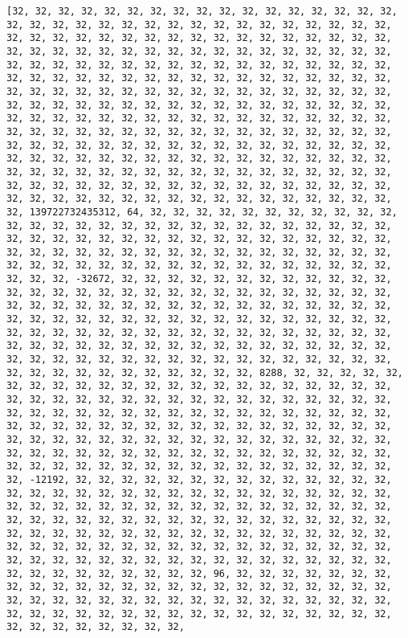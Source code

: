 \documentclass[11pt]{article}
\begin{document}
    \begin{Verbatim}[commandchars=\\\{\}]
[32, 32, 32, 32, 32, 32, 32, 32, 32, 32, 32, 32, 32, 32, 32, 32, 32, 32, 32, 32, 32, 32, 32, 32, 32, 32, 32, 32, 32, 32, 32, 32, 32, 32, 32, 32, 32, 32, 32, 32, 32, 32, 32, 32, 32, 32, 32, 32, 32, 32, 32, 32, 32, 32, 32, 32, 32, 32, 32, 32, 32, 32, 32, 32, 32, 32, 32, 32, 32, 32, 32, 32, 32, 32, 32, 32, 32, 32, 32, 32, 32, 32, 32, 32, 32, 32, 32, 32, 32, 32, 32, 32, 32, 32, 32, 32, 32, 32, 32, 32, 32, 32, 32, 32, 32, 32, 32, 32, 32, 32, 32, 32, 32, 32, 32, 32, 32, 32, 32, 32, 32, 32, 32, 32, 32, 32, 32, 32, 32, 32, 32, 32, 32, 32, 32, 32, 32, 32, 32, 32, 32, 32, 32, 32, 32, 32, 32, 32, 32, 32, 32, 32, 32, 32, 32, 32, 32, 32, 32, 32, 32, 32, 32, 32, 32, 32, 32, 32, 32, 32, 32, 32, 32, 32, 32, 32, 32, 32, 32, 32, 32, 32, 32, 32, 32, 32, 32, 32, 32, 32, 32, 32, 32, 32, 32, 32, 32, 32, 32, 32, 32, 32, 32, 32, 32, 32, 32, 32, 32, 32, 32, 32, 32, 32, 32, 32, 32, 32, 32, 32, 32, 32, 32, 32, 32, 32, 32, 32, 32, 32, 32, 32, 32, 32, 32, 32, 32, 32, 32, 32, 32, 32, 32, 32, 32, 32, 32, 32, 32, 32, 32, 32, 32, 32, 32, 32, 139722732435312, 64, 32, 32, 32, 32, 32, 32, 32, 32, 32, 32, 32, 32, 32, 32, 32, 32, 32, 32, 32, 32, 32, 32, 32, 32, 32, 32, 32, 32, 32, 32, 32, 32, 32, 32, 32, 32, 32, 32, 32, 32, 32, 32, 32, 32, 32, 32, 32, 32, 32, 32, 32, 32, 32, 32, 32, 32, 32, 32, 32, 32, 32, 32, 32, 32, 32, 32, 32, 32, 32, 32, 32, 32, 32, 32, 32, 32, 32, 32, 32, 32, 32, 32, -32672, 32, 32, 32, 32, 32, 32, 32, 32, 32, 32, 32, 32, 32, 32, 32, 32, 32, 32, 32, 32, 32, 32, 32, 32, 32, 32, 32, 32, 32, 32, 32, 32, 32, 32, 32, 32, 32, 32, 32, 32, 32, 32, 32, 32, 32, 32, 32, 32, 32, 32, 32, 32, 32, 32, 32, 32, 32, 32, 32, 32, 32, 32, 32, 32, 32, 32, 32, 32, 32, 32, 32, 32, 32, 32, 32, 32, 32, 32, 32, 32, 32, 32, 32, 32, 32, 32, 32, 32, 32, 32, 32, 32, 32, 32, 32, 32, 32, 32, 32, 32, 32, 32, 32, 32, 32, 32, 32, 32, 32, 32, 32, 32, 32, 32, 32, 32, 32, 32, 32, 32, 32, 32, 32, 32, 32, 8288, 32, 32, 32, 32, 32, 32, 32, 32, 32, 32, 32, 32, 32, 32, 32, 32, 32, 32, 32, 32, 32, 32, 32, 32, 32, 32, 32, 32, 32, 32, 32, 32, 32, 32, 32, 32, 32, 32, 32, 32, 32, 32, 32, 32, 32, 32, 32, 32, 32, 32, 32, 32, 32, 32, 32, 32, 32, 32, 32, 32, 32, 32, 32, 32, 32, 32, 32, 32, 32, 32, 32, 32, 32, 32, 32, 32, 32, 32, 32, 32, 32, 32, 32, 32, 32, 32, 32, 32, 32, 32, 32, 32, 32, 32, 32, 32, 32, 32, 32, 32, 32, 32, 32, 32, 32, 32, 32, 32, 32, 32, 32, 32, 32, 32, 32, 32, 32, 32, 32, 32, 32, 32, 32, 32, 32, -12192, 32, 32, 32, 32, 32, 32, 32, 32, 32, 32, 32, 32, 32, 32, 32, 32, 32, 32, 32, 32, 32, 32, 32, 32, 32, 32, 32, 32, 32, 32, 32, 32, 32, 32, 32, 32, 32, 32, 32, 32, 32, 32, 32, 32, 32, 32, 32, 32, 32, 32, 32, 32, 32, 32, 32, 32, 32, 32, 32, 32, 32, 32, 32, 32, 32, 32, 32, 32, 32, 32, 32, 32, 32, 32, 32, 32, 32, 32, 32, 32, 32, 32, 32, 32, 32, 32, 32, 32, 32, 32, 32, 32, 32, 32, 32, 32, 32, 32, 32, 32, 32, 32, 32, 32, 32, 32, 32, 32, 32, 32, 32, 32, 32, 32, 32, 32, 32, 32, 32, 32, 32, 32, 32, 32, 32, 96, 32, 32, 32, 32, 32, 32, 32, 32, 32, 32, 32, 32, 32, 32, 32, 32, 32, 32, 32, 32, 32, 32, 32, 32, 32, 32, 32, 32, 32, 32, 32, 32, 32, 32, 32, 32, 32, 32, 32, 32, 32, 32, 32, 32, 32, 32, 32, 32, 32, 32, 32, 32, 32, 32, 32, 32, 32, 32, 32, 32, 32, 32, 32, 32, 32, 32, 
\end{Verbatim}
\end{document}
